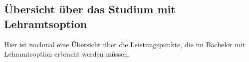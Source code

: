 %
%
%
%
%


\subsection{Übersicht über das Studium mit Lehramtsoption} %
Hier ist nochmal eine Übersicht über die Leistungspunkte, die im Bachelor mit Lehramtsoption erbracht werden müssen.

